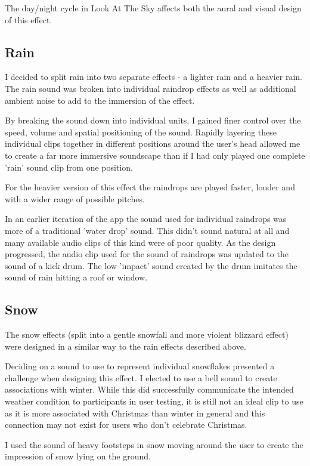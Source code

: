 \documentclass{l4proj}
\begin{document}
The day/night cycle in Look At The Sky affects both the aural and visual design of this effect.

\subsection{Rain}
I decided to split rain into two separate effects - a lighter rain and a heavier rain. The rain sound was broken into individual raindrop effects as well as additional ambient noise to add to the immersion of the effect.

By breaking the sound down into individual units, I gained finer control over the speed, volume and spatial positioning of the sound. Rapidly layering these individual clips together in different positions around the user's head allowed me to create a far more immersive soundscape than if I had only played one complete 'rain' sound clip from one position.

For the heavier version of this effect the raindrops are played faster, louder and with a wider range of possible pitches.

In an earlier iteration of the app the sound used for individual raindrops was more of a traditional 'water drop' sound. This didn't sound natural at all and many available audio clips of this kind were of poor quality. As the design progressed, the audio clip used for the sound of raindrops was updated to the sound of a kick drum. The low 'impact' sound created by the drum imitates the sound of rain hitting a roof or window.

\subsection{Snow}
The snow effects (split into a gentle snowfall and more violent blizzard effect) were designed in a similar way to the rain effects described above. 

Deciding on a sound to use to represent individual snowflakes presented a challenge when designing this effect. I elected to use a bell sound to create associations with winter.  While this did successfully communicate the intended weather condition to participants in user testing, it is still not an ideal clip to use as it is more associated with Christmas than winter in general and this connection may not exist for users who don't celebrate Christmas.

I used the sound of heavy footsteps in snow moving around the user to create the impression of snow lying on the ground.
\end{document}
